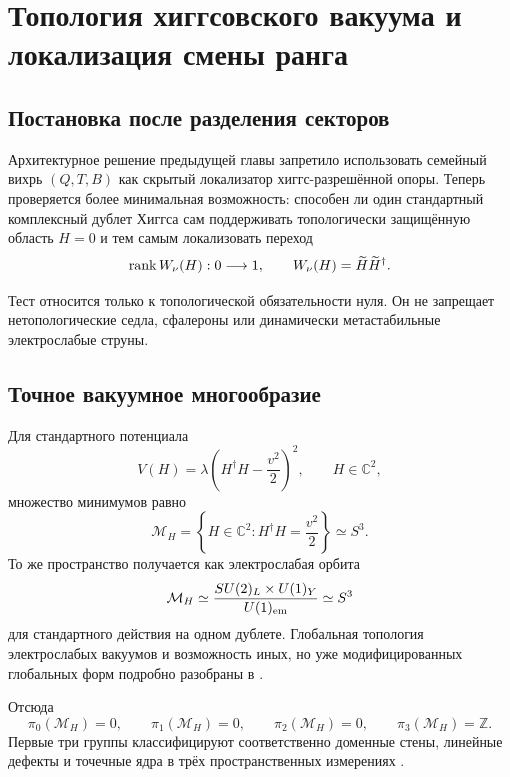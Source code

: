 \chapter{Топология хиггсовского вакуума и локализация смены ранга}
\label{ch:v6-spectral-transition-higgs-vacuum-topology-localization-gate}

\section{Постановка после разделения секторов}

Архитектурное решение предыдущей главы запретило использовать семейный
вихрь $(Q,T,B)$ как скрытый локализатор хиггс-разрешённой опоры. Теперь
проверяется более минимальная возможность: способен ли один стандартный
комплексный дублет Хиггса сам поддерживать топологически защищённую область
$H=0$ и тем самым локализовать переход
\begin{equation}
 \operatorname{rank} W_\nu(H):0\longrightarrow1,
 \qquad
 W_\nu(H)=\widetilde H\widetilde H^\dagger.
\end{equation}

Тест относится только к топологической обязательности нуля. Он не
запрещает нетопологические седла, сфалероны или динамически метастабильные
электрослабые струны.

\section{Точное вакуумное многообразие}

Для стандартного потенциала
\begin{equation}
 V(H)=\lambda\left(H^\dagger H-\frac{v^2}{2}\right)^2,
 \qquad H\in\mathbb C^2,
\end{equation}
множество минимумов равно
\begin{equation}
 \mathcal M_H=\left\{H\in\mathbb C^2:
 H^\dagger H=\frac{v^2}{2}\right\}\simeq S^3.
 \label{eq:v6-higgs-vacuum-s3}
\end{equation}
То же пространство получается как электрослабая орбита
\begin{equation}
 \mathcal M_H\simeq
 \frac{SU(2)_L\times U(1)_Y}{U(1)_{\rm em}}
 \simeq S^3
\end{equation}
для стандартного действия на одном дублете. Глобальная топология
электрослабых вакуумов и возможность иных, но уже модифицированных
глобальных форм подробно разобраны в
\cite{higgs-topology-gripaios-randal-williams2017}.

Отсюда
\begin{equation}
 \pi_0(\mathcal M_H)=0,
 \qquad
 \pi_1(\mathcal M_H)=0,
 \qquad
 \pi_2(\mathcal M_H)=0,
 \qquad
 \pi_3(\mathcal M_H)=\mathbb Z.
 \label{eq:v6-higgs-homotopy-ledger}
\end{equation}
Первые три группы классифицируют соответственно доменные стены,
линейные дефекты и точечные ядра в трёх пространственных измерениях
\cite{higgs-topology-mermin1979,higgs-topology-achucarro-vachaspati2000}.

